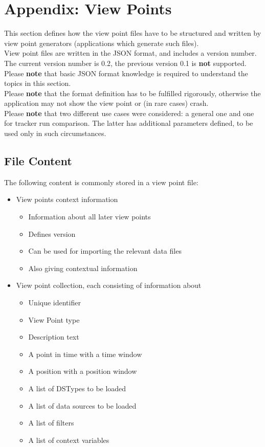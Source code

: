 \section{Appendix: View Points}
\label{sec:appendix_view_points} 

This section defines how the view point files have to be structured and written by view point generators (applications which generate such files). \\

View point files are written in the JSON format, and includes a version number. The current version number is 0.2, the previous version 0.1 is \textbf{not} supported. \\

Please \textbf{note} that basic JSON format knowledge is required to understand the topics in this section. \\

Please \textbf{note} that the format definition has to be fulfilled rigorously, otherwise the application may not show the view point or (in rare cases) crash. \\

Please \textbf{note} that two different use cases were considered: a general one and one for tracker run comparison. The latter has additional parameters defined, to be used only in such circumstances.

\subsection{File Content}

The following content is commonly stored in a view point file:
 \begin{itemize}
 \item View points context information
 \begin{itemize}
 \item Information about all later view points
 \item Defines version
 \item Can be used for importing the relevant data files
 \item Also giving contextual information
 \end{itemize}
 \item View point collection, each consisting of information about
 \begin{itemize}
 \item Unique identifier
 \item View Point type
 \item Description text
 \item A point in time with a time window
 \item A position with a position window
 \item A list of DSTypes to be loaded
 \item A list of data sources to be loaded
 \item A list of filters
 \item A list of context variables
  \end{itemize}
 \end{itemize}

